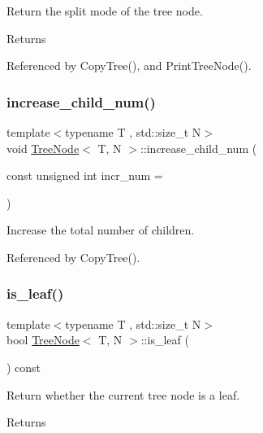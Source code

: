 Return the split mode of the tree node. \begin{DoxyReturn}{Returns}

\end{DoxyReturn}


Referenced by Copy\+Tree(), and Print\+Tree\+Node().

\mbox{\label{classTreeNode_a1d471684d9c06b5721217fb55182bdeb}} 
\subsubsection{\texorpdfstring{increase\+\_\+child\+\_\+num()}{increase\_child\_num()}}
{\footnotesize\ttfamily template$<$typename T , std\+::size\+\_\+t N$>$ \\
void \hyperlink{classTreeNode}{Tree\+Node}$<$ T, N $>$\+::increase\+\_\+child\+\_\+num (\begin{DoxyParamCaption}\item[{const unsigned int}]{incr\+\_\+num = {} }\end{DoxyParamCaption})}

Increase the total number of children. 

Referenced by Copy\+Tree().

\mbox{\label{classTreeNode_a64bf0bc987b1abe5ba10cdf32f093b58}} 
\subsubsection{\texorpdfstring{is\+\_\+leaf()}{is\_leaf()}}
{\footnotesize\ttfamily template$<$typename T , std\+::size\+\_\+t N$>$ \\
bool \hyperlink{classTreeNode}{Tree\+Node}$<$ T, N $>$\+::is\+\_\+leaf (\begin{DoxyParamCaption}{ }\end{DoxyParamCaption}) const}

Return whether the current tree node is a leaf. \begin{DoxyReturn}{Returns}

\end{DoxyReturn}
\mbox{\label{classTreeNode_ad2eb3a4d2a8d9dad252ee721bab24655}} 
